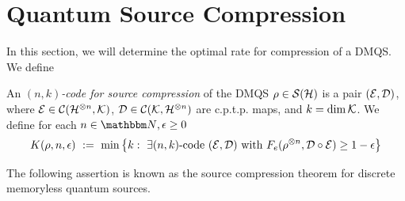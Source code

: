 \section{Quantum Source Compression} \label{section:source_compression}
In this section, we will determine the optimal rate for compression of a DMQS. We define  
\begin{definition}
 An \emph{$(n,k)$-code for source compression} of the DMQS $\rho \in {\mathcal S}({\mathcal H})$ is a pair $({\mathcal E},{\mathcal D})$, where ${\mathcal E} \in {\mathcal C}({\mathcal H}^{\otimes n}, {\mathcal K})$, ${\mathcal D} \in {\mathcal C}({\mathcal K}, {\mathcal H}^{\otimes n})$ are c.p.t.p. maps, and $k = \dim {\mathcal K}$. 
 We define for each $n \in \bbmN, \epsilon \geq 0$
 \begin{align*}
  K(\rho, n, \epsilon) \ := \ \min\left\{k: \ \exists(n,k) \text{-code} \ ({\mathcal E}, {\mathcal D}) \ \text{with} \ F_e(\rho^{\otimes n}, {\mathcal D} \circ {\mathcal E}) \geq 1 - \epsilon \right\}
 \end{align*}
\end{definition}
The following assertion is known as the source compression theorem for discrete memoryless quantum sources.

